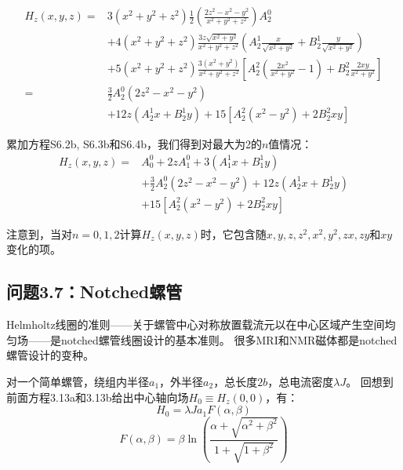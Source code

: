 \begin{equation*}%
\begin{split}
H_z(x,y,z)=&3(x^2+y^2+z^2)\frac{1}{2}\left(\frac{2z^2-x^2-y^2}{x^2+y^2+z^2}\right)A_{2}^{0}\\
&+4(x^2+y^2+z^2)\frac{3z\sqrt{x^2+y^2}}{x^2+y^2+z^2}
\left(A_{2}^{1}\frac{x}{\sqrt{x^2+y^2}}+B_{2}^{1}\frac{y}{\sqrt{x^2+y^2}}\right)\\
&+5(x^2+y^2+z^2)\frac{3(x^2+y^2)}{x^2+y^2+z^2}\left[A_{2}^{2}(\frac{2x^2}{x^2+y^2}-1)+B_{2}^{2}\frac{2xy}{x^2+y^2}\right]\\
=&\frac{3}{2}A_{2}^{0}(2z^2-x^2-y^2)\\
&+12z(A_{2}^{1}x+B_{2}^{1}y)+15[A_{2}^{2}(x^2-y^2)+2B_{2}^{2}xy]
\end{split}\tag{S6.4b}
\end{equation*}

累加方程S6.2b, S6.3b和S6.4b，我们得到对最大为2的$n$值情况：
\begin{equation*}%
\begin{split}
H_z(x,y,z)=&A_{0}^{0}+2zA_{1}^{0}+3(A_{1}^{1}x+B_{1}^{1}y)\\
&+\frac{3}{2}A_{2}^{0}(2z^2-x^2-y^2)+12z(A_{2}^{1}x+B_{2}^{1}y)\\
&+15[A_{2}^{2}(x^2-y^2)+2B_{2}^{2}xy]
\end{split}\tag{3.126c}
\end{equation*}

注意到，当对$n=0,1,2$计算$H_z(x, y, z)$时，它包含随$x, y, z, z^2, x^2, y^2, zx, zy$和$xy$变化的项。


\subsection{问题3.7：Notched螺管}
Helmholtz线圈的准则——关于螺管中心对称放置载流元以在中心区域产生空间均匀场——是notched螺管线圈设计的基本准则。
很多MRI和NMR磁体都是notched螺管设计的变种。

对一个简单螺管，绕组内半径$a_1$，外半径$a_2$，总长度$2b$，总电流密度$\lambda J$。
回想到前面方程3.13a和3.13b给出中心轴向场$H_0\equiv H_z(0, 0)$，有：
 \begin{equation*}%
H_0=\lambda Ja_1F(\alpha,\beta) \tag{3.13a}
\end{equation*}
\begin{equation*}%
F(\alpha,\beta)=\beta\ln\left(\frac{\alpha+\sqrt{\alpha^2+\beta^2}}{1+\sqrt{1+\beta^2}}\right)\tag{3.13b}
\end{equation*}

